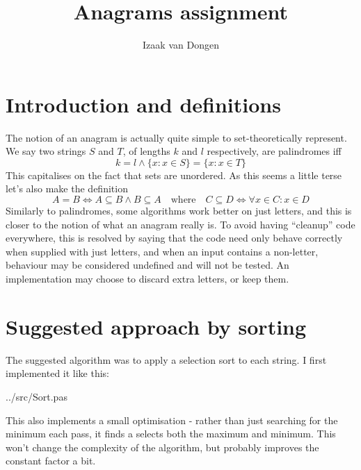 \documentclass[fleqn,a4paper,11pt]{article}
\title{Anagrams assignment}
\author{Izaak van Dongen}
\begin{document}
    \maketitle\thispagestyle{empty} %
    \tableofcontents

    \section{Introduction and definitions}

    The notion of an anagram is actually quite simple to set-theoretically
    represent. We say two strings \(S\) and \(T\), of lengths \(k\) and \(l\)
    respectively, are palindromes iff
    \begin{equation}
        k = l \land \{x: x \in S\} = \{x: x \in T\}
    \end{equation}
    This capitalises on the fact that sets are unordered. As this seems a
    little terse let's also make the definition
    \begin{equation}
        A = B \iff A \subseteq B \land B \subseteq A \quad
            \text{where} \quad
            C \subseteq D \iff \forall x \in C: x \in D
    \end{equation}
    Similarly to palindromes, some algorithms work better on just letters, and
    this is closer to the notion of what an anagram really is. To avoid having
    ``cleanup'' code everywhere, this is resolved by saying that the code need
    only behave correctly when supplied with just letters, and when an input
    contains a non-letter, behaviour may be considered undefined and will not
    be tested. An implementation may choose to discard extra letters, or keep
    them.

    \section{Suggested approach by sorting}

    The suggested algorithm was to apply a selection sort to each string. I
    first implemented it like this:


{../src/Sort.pas}

    This also implements a small optimisation - rather than just searching for
    the minimum each pass, it finds a selects both the maximum and minimum. This
    won't change the complexity of the algorithm, but probably improves the
    constant factor a bit.
\end{document}
